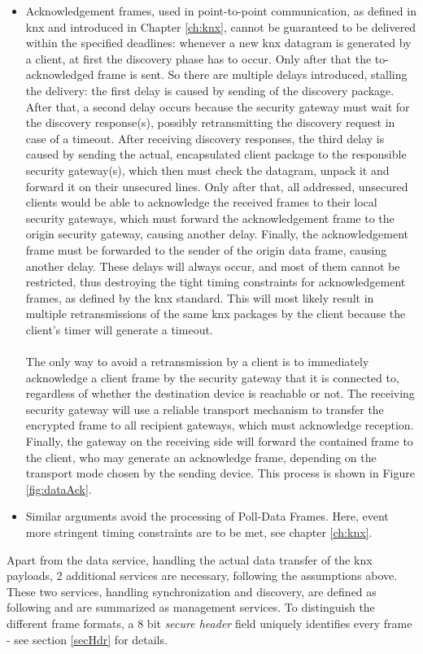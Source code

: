 \begin{itemize}
 \item Acknowledgement frames, used in point-to-point communication, as defined in \gls{knx} and introduced in Chapter \ref{ch:knx}, cannot be guaranteed to be
 delivered within the specified deadlines: whenever
 a new \gls{knx} datagram is generated by a client, at first the discovery phase has to occur. Only after that the to-acknowledged frame is sent. So there are
 multiple delays introduced, stalling the delivery: the first delay is caused by sending of the discovery package.
 After that, a second delay occurs because the security gateway must wait for the discovery response(s), possibly retransmitting the discovery request
 in case of a timeout. After receiving discovery responses, the third delay is caused by sending the actual, encapsulated
 client package to the responsible security gateway(s), which then must check the datagram, unpack it and forward it on their unsecured lines.
 Only after that, all addressed, unsecured clients would be able to acknowledge the received frames
 to their local security gateways,
 which must forward the acknowledgement frame to the origin security gateway, causing another delay. Finally, the acknowledgement frame must be forwarded to the sender of
 the origin data frame, causing another delay.
 These delays will always occur, and most of them cannot be restricted, thus destroying the tight timing constraints for acknowledgement frames, as defined
 by the \gls{knx} standard. This
 will most likely result in multiple retransmissions of the same \gls{knx} packages
 by the client because the client's timer will generate a timeout. 
 \\
 \\
 The only way to avoid a retransmission by a client is to immediately acknowledge a client frame by the security
 gateway that it is connected to, regardless of whether the destination device is reachable or not. The receiving security gateway will use a reliable transport
 mechanism to transfer the encrypted frame to all recipient gateways, which must acknowledge reception.
 Finally, the gateway on the receiving side will forward the contained frame to the client, who may generate an acknowledge frame, depending on the transport
 mode chosen by the sending device. This process is shown in Figure \ref{fig:dataAck}.
 \item Similar arguments avoid the processing of Poll-Data Frames. Here, event more stringent timing constraints are to be met, see chapter \ref{ch:knx}. 
\end{itemize}
Apart from the data service, handling the actual data transfer of the \gls{knx} payloads, 2 additional services are necessary, following the assumptions above.
These two services, handling synchronization and discovery, are defined as following and are summarized as management services. To distinguish the different
frame formats, a 8 bit \textit{secure header} field uniquely identifies every frame - see section \ref{secHdr} for details.

